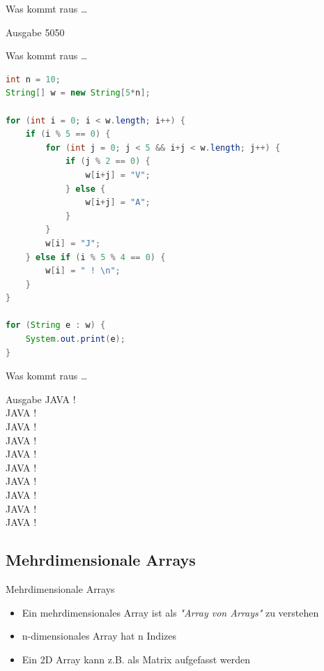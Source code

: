 \documentclass[18pt]{beamer}
\begin{document}
\begin{frame}{Was kommt raus \dots}
    \begin{exampleblock}{Ausgabe}
        5050
    \end{exampleblock}
\end{frame}

\begin{frame}[fragile]{Was kommt raus \dots}
    \begin{lstlisting}[language=Java,basicstyle=\scriptsize]
int n = 10;
String[] w = new String[5*n];

for (int i = 0; i < w.length; i++) {
    if (i % 5 == 0) {
        for (int j = 0; j < 5 && i+j < w.length; j++) {
            if (j % 2 == 0) {
                w[i+j] = "V";
            } else {
                w[i+j] = "A";
            }
        }
        w[i] = "J";
    } else if (i % 5 % 4 == 0) {
        w[i] = " ! \n";
    }
}

for (String e : w) {
    System.out.print(e);
}
    \end{lstlisting}

\end{frame}

\begin{frame}{Was kommt raus \dots}
    \begin{exampleblock}{Ausgabe}
        JAVA !\\
        JAVA !\\
        JAVA !\\
        JAVA !\\
        JAVA !\\
        JAVA !\\
        JAVA !\\
        JAVA !\\
        JAVA !\\
        JAVA !
    \end{exampleblock}
\end{frame}

\subsection{Mehrdimensionale Arrays}

\begin{frame}{Mehrdimensionale Arrays}
    \begin{itemize}
        \item Ein mehrdimensionales Array ist als \textit{"Array von Arrays"} zu verstehen
        \item n-dimensionales Array hat n Indizes
        \item Ein 2D Array kann z.B. als Matrix aufgefasst werden
    \end{itemize}
\end{frame}
\end{document}
